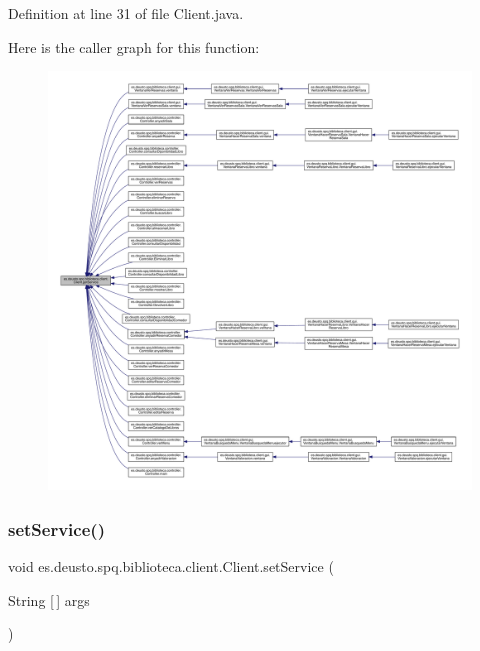 Definition at line 31 of file Client.\+java.

Here is the caller graph for this function\+:
\nopagebreak
\begin{figure}[H]
\begin{center}
\leavevmode
\includegraphics[width=350pt]{classes_1_1deusto_1_1spq_1_1biblioteca_1_1client_1_1_client_a81c65efd5ee6eb820c325225532fa3fb_icgraph}
\end{center}
\end{figure}
\mbox{\label{classes_1_1deusto_1_1spq_1_1biblioteca_1_1client_1_1_client_a96d3aee6ac3ad17ea896e4c50115bdf6}} 
\subsubsection{\texorpdfstring{set\+Service()}{setService()}}
{\footnotesize\ttfamily void es.\+deusto.\+spq.\+biblioteca.\+client.\+Client.\+set\+Service (\begin{DoxyParamCaption}\item[{String \mbox{[}$\,$\mbox{]}}]{args }\end{DoxyParamCaption})}

